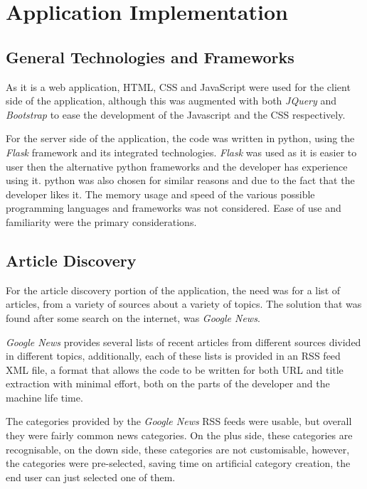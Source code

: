 \chapter{Application Implementation}

\section{General Technologies and Frameworks}

As it is a web application, HTML, CSS and JavaScript were used for the client side of the application, although this was augmented with both \textit{JQuery} and \textit{Bootstrap} to ease the development of the Javascript and the CSS respectively. 

For the server side of the application, the code was written in python, using the \textit{Flask} framework and its integrated technologies. \textit{Flask} was used as it is easier to user then the alternative python frameworks and the developer has experience using it. python was also chosen for similar reasons and due to the fact that the developer likes it. The memory usage and speed of the various possible programming languages and frameworks was not considered. Ease of use and familiarity were the primary considerations. 

\section{Article Discovery}

For the article discovery portion of the application, the need was for a list of articles, from a variety of sources about a variety of topics. The solution that was found after some search on the internet, was \textit{Google News}.

\textit{Google News} provides several lists of recent articles from different sources divided in different topics, additionally, each of these lists is provided in an RSS feed XML file, a format that allows the code to be written for both URL and title extraction with minimal effort, both on the parts of the developer and the machine life time.

The categories provided by the \textit{Google News} RSS feeds were usable, but overall they were fairly common news categories. On the plus side, these categories are recognisable, on the down side, these categories are not customisable, however, the categories were pre-selected, saving time on artificial category creation, the end user can just selected one of them. 

